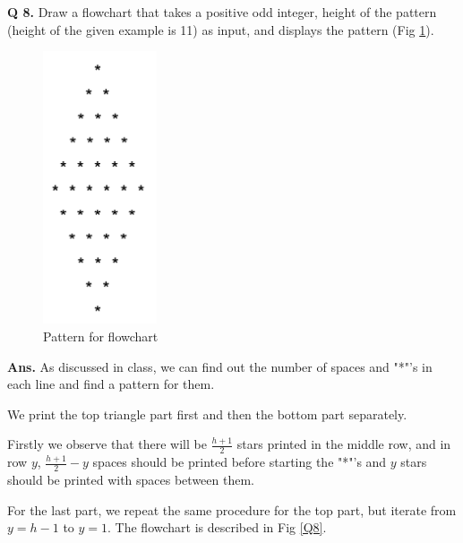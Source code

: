 \documentclass{article}
\begin{document}
\begin{flushleft}

    \textbf{Q 8. } Draw a flowchart that takes a positive odd integer, height 
    of the pattern (height of the given example is 11) as input, and displays 
    the pattern (Fig \ref{Q8_fig}).

    \begin{figure}[ht]
        \centering
        \includegraphics[width=0.3\textwidth]{Q8_fig.png}
        \caption{Pattern for flowchart}
        \label{Q8_fig}
    \end{figure}

    \end{flushleft}
    
    \begin{flushleft}
    
    \textbf{Ans. } As discussed in class, we can find out the number of
    spaces and "*"'s in each line and find a pattern for them.

    We print the top triangle part first and then the bottom part separately.

    Firstly we observe that there will be $\frac{h+1}{2}$ stars printed in the 
    middle row, and in row $y$, $\frac{h+1}{2} - y$ spaces should be printed
    before starting the "*"'s and $y$ stars should be printed with spaces between 
    them.

    For the last part, we repeat the same procedure for the top part, but 
    iterate from $y = h-1$ to $y = 1$. The flowchart is described in Fig \ref{Q8}.

    \end{flushleft}
    
\end{document}
